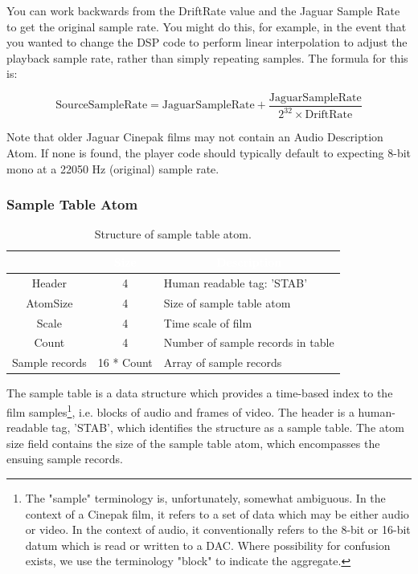 \documentclass[12pt,letterpaper,twoside]{article}
\newcommand{\tabheadtxt}[1]{\multicolumn{1}{c}{\textcolor{white}{\textbf{#1}}}}
\begin{document}
You can work backwards from the DriftRate value and the Jaguar Sample Rate to get the original sample rate. You might do this, for example, in the event that you wanted to change the DSP code to perform linear interpolation to adjust the playback sample rate, rather than simply repeating samples. The formula for this is:

\begin{equation}
\mathrm{SourceSampleRate} = \mathrm{JaguarSampleRate} + \frac{\mathrm{JaguarSampleRate}}{2^{32} \times \mathrm{DriftRate}}
\end{equation}

Note that older Jaguar Cinepak films may not contain an Audio Description Atom. If none is found, the player code should typically default to expecting 8-bit mono at a 22050 Hz (original) sample rate.

\subsubsection{Sample Table Atom}

\begin{table}[h]
\centering
\begin{tabular}{|c|c|p{10cm}|}
\hline
\rowcolor{black}
\tabheadtxt{Field} & \tabheadtxt{Size} & \tabheadtxt{Description} \\
\hline
Header& 4 & Human readable tag: 'STAB'\\
\hline
AtomSize & 4 & Size of sample table atom\\ 
\hline
Scale & 4 & Time scale of film\\ 
\hline
Count & 4 & Number of sample records in table\\
\hline
Sample records & 16 * Count & Array of sample records\\ 
\hline
\end{tabular}
\caption{Structure of sample table atom.}
\label{tab:sampletab}
\end{table}
\FloatBarrier

The sample table is a data structure which provides a time-based index to the film samples\footnote{The "sample" terminology is, unfortunately, somewhat ambiguous. In the context of a Cinepak film, it refers to a set of data which may be either audio or video. In the context of audio, it conventionally refers to the 8-bit or 16-bit datum which is read or written to a DAC. Where possibility for confusion exists, we use the terminology "block" to indicate the aggregate.}, i.e. blocks of audio and frames of video. The header is a human-readable tag, 'STAB', which identifies the structure as a sample table. The atom size field contains the size of the sample table atom, which encompasses the ensuing sample records. 
\end{document}
